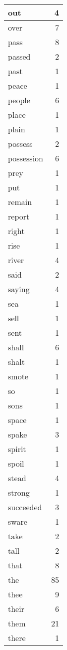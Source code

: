 \begin{center}
\begin{longtable}{l|r}
out & 4 \\ \hline
over & 7 \\ \hline
pass & 8 \\ \hline
passed & 2 \\ \hline
past & 1 \\ \hline
peace & 1 \\ \hline
people & 6 \\ \hline
place & 1 \\ \hline
plain & 1 \\ \hline
possess & 2 \\ \hline
possession & 6 \\ \hline
prey & 1 \\ \hline
put & 1 \\ \hline
remain & 1 \\ \hline
report & 1 \\ \hline
right & 1 \\ \hline
rise & 1 \\ \hline
river & 4 \\ \hline
said & 2 \\ \hline
saying & 4 \\ \hline
sea & 1 \\ \hline
sell & 1 \\ \hline
sent & 1 \\ \hline
shall & 6 \\ \hline
shalt & 1 \\ \hline
smote & 1 \\ \hline
so & 1 \\ \hline
sons & 1 \\ \hline
space & 1 \\ \hline
spake & 3 \\ \hline
spirit & 1 \\ \hline
spoil & 1 \\ \hline
stead & 4 \\ \hline
strong & 1 \\ \hline
succeeded & 3 \\ \hline
sware & 1 \\ \hline
take & 2 \\ \hline
tall & 2 \\ \hline
that & 8 \\ \hline
the & 85 \\ \hline
thee & 9 \\ \hline
their & 6 \\ \hline
them & 21 \\ \hline
there & 1 \\ \hline

\end{longtable}
\end{center}
